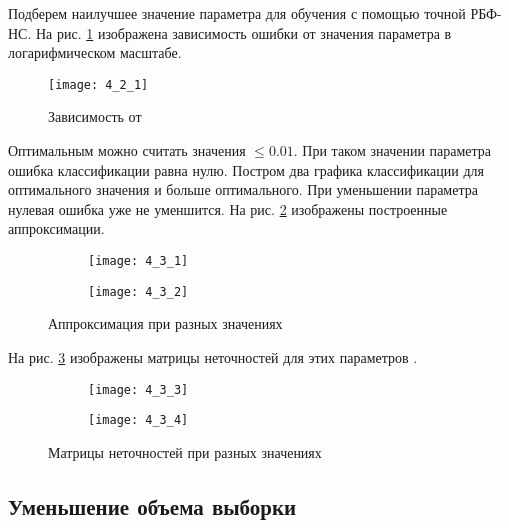 Подберем наилучшее значение параметра  для обучения с помощью точной РБФ-НС. На рис. \ref{fig:4_2_1} изображена зависимость ошибки  от значения параметра  в логарифмическом масштабе. 
\begin{figure}[H]
\begin{center}
	\texttt{[image: 4\_2\_1]}
	\caption{Зависимость  от }
	\label{fig:4_2_1}
\end{center}
\end{figure}

Оптимальным можно считать значения  $\leq 0.01$. При таком значении параметра ошибка классификации равна нулю. Постром два графика классификации для оптимального значения  и больше оптимального. При уменьшении параметра нулевая ошибка уже не уменшится. На рис. \ref{fig:4_3_1} изображены построенные аппроксимации.
\begin{figure}[H]
\begin{center}
	\begin{subfigure}{0.49\textwidth}
		\texttt{[image: 4\_3\_1]}
		\caption{}
	\end{subfigure}
	\begin{subfigure}{0.49\textwidth}
		\texttt{[image: 4\_3\_2]}
		\caption{}
	\end{subfigure}
	\caption{Аппроксимация при разных значениях }
	\label{fig:4_3_1}
\end{center}
\end{figure}

На рис. \ref{fig:3_3_3} изображены матрицы неточностей для этих параметров .
\begin{figure}[H]
\begin{center}
	\begin{subfigure}{0.49\textwidth}
		\texttt{[image: 4\_3\_3]}
		\caption{}
	\end{subfigure}
	\begin{subfigure}{0.49\textwidth}
		\texttt{[image: 4\_3\_4]}
		\caption{}
	\end{subfigure}
	\caption{Матрицы неточностей при разных значениях }
	\label{fig:3_3_3}
\end{center}
\end{figure}

\subsection{Уменьшение объема выборки}

